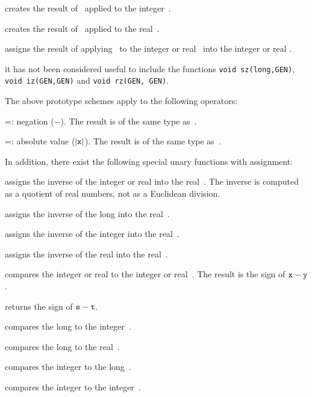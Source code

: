  creates the result of \op\ applied to the
integer~.

 creates the result of \op\ applied to the real~.

 assigns the result of applying \op\ to the
integer or real~ into the integer or real .

 it has not been considered useful to include the
functions {\tt void \op sz(long,GEN)}, {\tt void \op iz(GEN,GEN)} and
{\tt void \op rz(GEN, GEN)}.
\smallskip

\noindent The above prototype schemes apply to the following operators:

\op=: negation ($-$). The result is of the same type
as~.

\op=: absolute value ($|{\tt x}|$). The result is of the same type
as~.

\noindent In addition, there exist the following special unary functions with
assignment:

 assigns the inverse of the integer or
real  into the real~. The inverse is computed as a quotient
of real numbers, not as a Euclidean division.

 assigns the inverse of the long 
into the real~.

 assigns the inverse of the integer 
into the real~.

 assigns the inverse of the real  into
the real~.


 compares the integer or real  to the
integer or real~. The result is the sign of ${\tt x}-{\tt y}$.

 returns the sign of ${\tt s}-{\tt t}$.

 compares the long  to the
integer~.

 compares the long  to the real~.

 compares the integer  to the
long~.

 compares the integer  to the
integer~.

